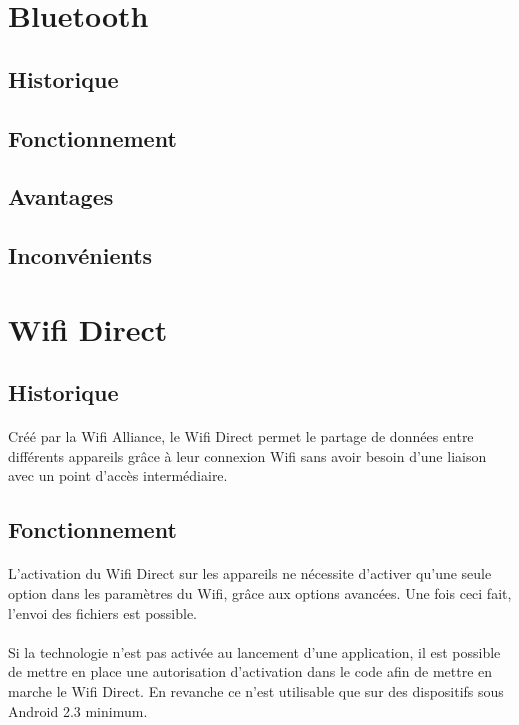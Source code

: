 \documentclass[a4paper,10pt]{report}
\begin{document}
  \section{Bluetooth}
    \subsection{Historique}
    \subsection{Fonctionnement} 
    \subsection{Avantages}
    \subsection{Inconvénients}
  \section{Wifi Direct}
    \subsection{Historique}
      \paragraph{}
      Créé par la Wifi Alliance, le Wifi Direct permet le partage de données entre différents appareils grâce à leur connexion Wifi sans avoir besoin d'une liaison avec un point d'accès intermédiaire.
    \subsection{Fonctionnement}
     \paragraph{}
    L'activation du Wifi Direct sur les appareils ne nécessite d'activer qu'une seule option dans les paramètres du Wifi, grâce aux options avancées. Une fois ceci fait, l'envoi des fichiers est possible.
    \paragraph{}
    Si la technologie n'est pas activée au lancement d'une application, il est possible de mettre en place une autorisation d'activation dans le code afin de mettre en marche le Wifi Direct. En revanche ce n'est utilisable que sur des dispositifs sous Android 2.3 minimum.
\end{document}
